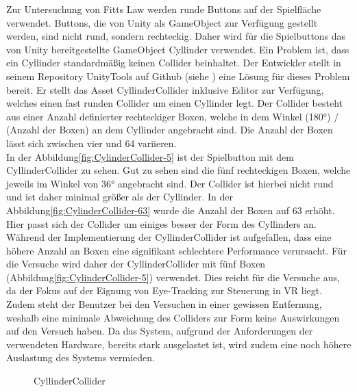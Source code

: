 Zur Untersuchung von Fitts Law werden runde Buttons auf der Spielfläche verwendet. Buttons, die von Unity als GameObject zur Verfügung gestellt werden, sind nicht rund, sondern rechteckig. Daher wird für die Spielbuttons das von Unity bereitgestellte GameObject \glqq Cyllinder\grqq{} verwendet. Ein Problem ist, dass ein Cyllinder standardmäßig keinen Collider beinhaltet. Der Entwickler \citeauthor{kode80.2016} stellt in seinem Repository UnityTools auf Github (siehe \cite{kode80.2016}) eine Lösung für dieses Problem bereit. Er stellt das Asset \glqq CyllinderCollider\grqq{} inklusive Editor zur Verfügung, welches einen fast runden Collider um einen Cyllinder legt. Der Collider besteht aus einer Anzahl definierter rechteckiger Boxen, welche in dem Winkel (180°) / (Anzahl der Boxen) an dem Cyllinder angebracht sind. Die Anzahl der Boxen lässt sich zwischen vier und 64 variieren.\\
In der Abbildung\autoref{fig:CylinderCollider-5} ist der Spielbutton mit dem CyllinderCollider zu sehen. Gut zu sehen sind die fünf rechteckigen Boxen, welche jeweils im Winkel von 36° angebracht sind. Der Collider ist hierbei nicht rund und ist daher minimal größer als der Cyllinder. In der Abbildung\autoref{fig:CylinderCollider-63} wurde die Anzahl der Boxen auf 63 erhöht. Hier passt sich der Collider um einiges besser der Form des Cyllinders an. Während der Implementierung der CyllinderCollider ist aufgefallen, dass eine höhere Anzahl an Boxen eine signifikant schlechtere Performance verursacht. Für die Versuche wird daher der CyllinderCollider mit fünf Boxen (Abbildung\autoref{fig:CylinderCollider-5}) verwendet. Dies reicht für die Versuche aus, da der Fokus auf der Eignung von Eye-Tracking zur Steuerung in \ac{VR} liegt. Zudem steht der Benutzer bei den Versuchen in einer gewissen Entfernung, weshalb eine minimale Abweichung des Colliders zur Form keine Auswirkungen auf den Versuch haben. Da das System, aufgrund der Anforderungen der verwendeten Hardware, bereits stark ausgelastet ist, wird zudem eine noch höhere Auslastung des Systems vermieden.

\begin{figure}[!htbp]
	\centering
	\qquad      
	\caption{CyllinderCollider}
	\label{fig:CylinderCollider}
\end{figure}  


